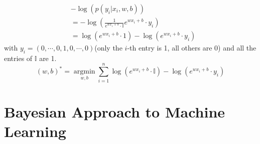 \begin{itemize}
\begin{equation}
\begin{split}
&-\log \left(p\left(y_{i} | x_{i}, w, b\right)\right)\\
&=-\log \left(\frac{1}{e^{w  x_i+b} \cdot \mathbb{I}} e^{w x_i+b} \cdot y_{i}\right)\\
&=\log \left(e^{w x_i  +b} \cdot 1\right)-\log \left(e^{w x_i+b} \cdot y_{i}\right)
\end{split}
\end{equation}
with $y_i=(0,\cdots, 0,1,0,\cdots, 0)$(only the $i$-th entry is 1, all others are 0) and all the entries of $\mathbb{I}$  are 1.
$$
(w, b)^{*}=\underset{w,b}{\operatorname{argmin}} \sum_{i=1}^{n} \log \left(e^{wx_{i}+b} \cdot \mathbb{I}\right)-\log \left(e^{wx_{i}+b} \cdot y_{i}\right)
$$
\end{itemize}

\section{Bayesian Approach to Machine Learning}
